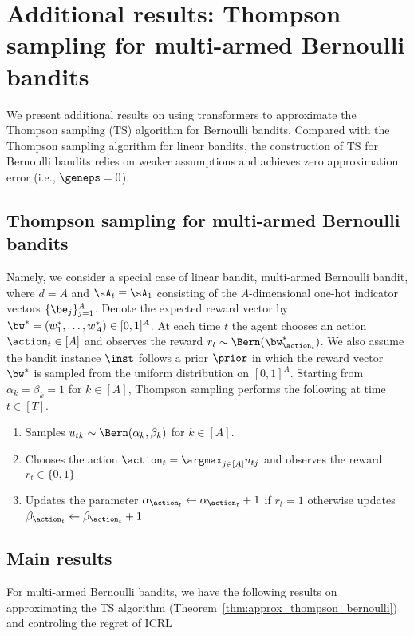 \section{Additional results: Thompson sampling for multi-armed Bernoulli bandits}\label{example:ts-app}

We present additional results on using transformers to approximate the Thompson sampling (TS) algorithm for Bernoulli bandits. Compared with the Thompson sampling algorithm for linear bandits, the construction of TS for  Bernoulli bandits relies on weaker assumptions and achieves zero approximation error (i.e., $\geneps=0$).










\subsection{Thompson sampling for multi-armed Bernoulli bandits}
Namely, we consider a special case of linear bandit, multi-armed Bernoulli bandit,  where $d=A$ and $\sA_t\equiv\sA_1$ consisting  of the $A$-dimensional one-hot indicator vectors $\{\be_j\}_{j=1}^A$. Denote the expected reward vector by $\bw^*=(w^*_1,\ldots,w^*_A)\in[0,1]^A$. At each time $t$ the agent chooses an action $\action_t\in[A]$ and observes the reward $r_t\sim\Bern(\bw^*_{\action_t})$.   We also assume the bandit instance $\inst$ follows a prior $\prior$ in which the reward vector $\bw^*$ is sampled from the uniform distribution on $[0,1]^A$.
Starting from $\alpha_{k}=\beta_{k}=1$ for $k\in[A]$, Thompson sampling performs the following at time $t\in[T]$.

\begin{enumerate}
    \item Samples $u_{tk}\sim\Bern(\alpha_{k},\beta_{k})$ for $k\in[A]$.
    \item Chooses the action $\action_t=\argmax_{j\in[A]}u_{tj}$ and observes the reward $r_t\in\{0,1\}$
    \item Updates the parameter $\alpha_{\action_t}\leftarrow\alpha_{\action_t}+1$ if $r_t=1$ otherwise updates $\beta_{\action_t}\leftarrow\beta_{\action_t}+1$.

\end{enumerate}


\subsection{Main results}
For multi-armed Bernoulli bandits, we have the following results on approximating the TS algorithm (Theorem~\ref{thm:approx_thompson_bernoulli}) and controling the regret of ICRL



